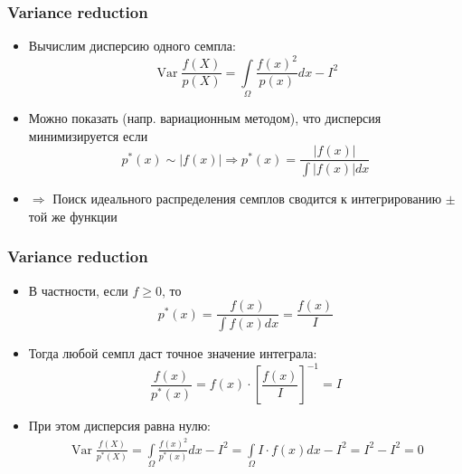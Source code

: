 \documentclass[handout,10pt]{beamer}
\begin{document}
\begin{frame}
\frametitle{Variance reduction}
\begin{itemize}
\item Вычислим дисперсию одного семпла:
\begin{equation*}
\operatorname{Var}\frac{f(X)}{p(X)} = \int\limits_\Omega \frac{f(x)^2}{p(x)}dx - I^2
\end{equation*}
\pause
\item Можно показать (напр. вариационным методом), что дисперсия минимизируется если
\begin{equation*}
p^*(x) \sim |f(x)| \Longrightarrow p^*(x) = \frac{|f(x)|}{\int |f(x)|dx}
\end{equation*}
\pause
\item \begin{math}\Longrightarrow\end{math} Поиск идеального распределения семплов сводится к интегрированию \begin{math}\pm\end{math} той же функции
\end{itemize}
\end{frame}

\begin{frame}
\frametitle{Variance reduction}
\begin{itemize}
\item В частности, если \begin{math}f\geq 0\end{math}, то 
\begin{equation*}
p^*(x) = \frac{f(x)}{\int f(x)dx} = \frac{f(x)}{I}
\end{equation*}
\pause
\item Тогда любой семпл даст точное значение интеграла:
\begin{equation*}
\frac{f(x)}{p^*(x)} = f(x) \cdot \left[\frac{f(x)}{I}\right]^{-1} = I
\end{equation*}
\pause
\item При этом дисперсия равна нулю:
\begin{gather*}
\operatorname{Var}\frac{f(X)}{p^*(X)} = \int\limits_\Omega \frac{f(x)^2}{p^*(x)}dx - I^2 = \int\limits_\Omega I\cdot f(x)dx - I^2 = I^2 - I^2 = 0
\end{gather*}
\end{itemize}
\end{frame}
\end{document}

